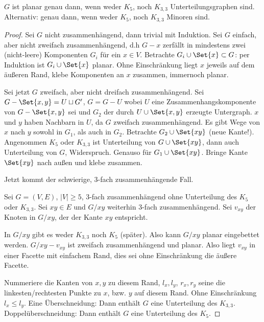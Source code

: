\begin{st}[Kuratowski, 1930]
    $G$ ist planar genau dann, wenn weder $K_5$, noch $K_{3,3}$ Unterteilungsgraphen sind.
    Alternativ: genau dann, wenn weder $K_5$, noch $K_{3,3}$ Minoren sind.
    \begin{proof}
        Sei $G$ nicht zusammenhängend, dann trivial mit Induktion.
        Sei $G$ einfach, aber nicht zweifach zusammenhängend, d.h $G - x$ zerfällt in mindestens zwei (nicht-leere) Komponenten $G_i$ für ein $x \in V$.
        Betrachte $G_i \cup \Set{x} \subset G$: per Induktion ist $G_i \cup \Set{x}$ planar.
        Ohne Einschränkung liegt $x$ jeweils auf dem äußeren Rand, klebe Komponenten an $x$ zusammen, immernoch planar.

        Sei jetzt $G$ zweifach, aber nicht dreifach zusammenhängend.
        Sei $G - \Set{x,y} = U \sqcup G'$, $G = G - U$ wobei $U$ eine Zusammenhangskomponente von $G - \Set{x,y}$ sei und $G_2$ der durch $U \cup \Set{x,y}$ erzeugte Untergraph.
        $x$ und $y$ haben Nachbarn in $U$, da $G$ zweifach zusammenhängend.
        Es gibt Wege von $x$ nach $y$ sowohl in $G_1$, als auch in $G_2$.
        Betrachte $G_2 \cup \Set{xy}$ (neue Kante!).
        Angenommen $K_5$ oder $K_{3,3}$ ist Unterteilung von $G \cup \Set{xy}$, dann auch Unterteilung von $G$, Widerspruch.
        Genauso für $G_1 \cup \Set{xy}$.
        Bringe Kante $\Set{xy}$ nach außen und klebe zusammen.

        Jetzt kommt der schwierige, 3-fach zusammenhängende Fall.

        Sei $G = (V, E)$, $|V| \ge 5$, 3-fach zusammenhängend ohne Unterteilung des $K_5$ oder $K_{3,3}$.
        Sei $xy \in E$ und $G / xy$ weiterhin 3-fach zusammenhängend.
        Sei $v_{xy}$ der Knoten in $G / xy$, der der Kante $xy$ entspricht.

        In $G / xy$ gibt es weder $K_{3,3}$ noch $K_5$ (später).
        Also kann $G / xy$ planar eingebettet werden.
        $G / xy - v_{xy}$ ist zweifach zusammenhängend und planar.
        Also liegt $v_{xy}$ in einer Facette mit einfachem Rand, dies sei ohne Einschränkung die äußere Facette.

        Nummeriere die Kanten von $x,y$ zu diesem Rand, $l_x, l_y$, $r_x, r_y$ seine die linkesten/rechtesten Punkte zu $x$, bzw. $y$ auf diesem Rand.
        Ohne Einschränkung $l_x \le l_y$.
        Eine Überschneidung: Dann enthält $G$ eine Unterteilung des $K_{3,3}$.
        Doppelüberschneidung: Dann enthält $G$ eine Unterteilung des $K_5$.
    \end{proof}
\end{st}

